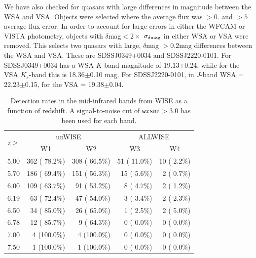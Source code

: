 \documentclass[usenatbib]{mnras}
\begin{document}
  We have also checked for quasars with large differences in magnitude
  between the WSA and VSA. Objects were selected where the average flux
  was $>0.$ and $>5$ average flux error. In order to account for large
  errors in either the WFCAM or VISTA photometry, objects with $\delta$mag$
  < 2 \times$ $\sigma_{\delta\rm mag}$ in either WSA or VSA were removed. This
  selects two quasars with large, $\delta$mag $>0.2$mag differences
  between the WSA and VSA. These are SDSSJ0349+0034 and
  SDSSJ2220-0101. For SDSSJ0349+0034 has a WSA $K$-band magnitude of
  19.13$\pm$0.24, while for the VSA $K_s$-band this is 18.36$\pm$0.10
  mag. For SDSSJ2220-0101, in $J$-band WSA = 22.23$\pm$0.15, for the VSA
  = 19.38$\pm$0.04.
          
  
\begin{table}
  \centering
  \begin{tabular}{l r r r r}
    \hline \hline
    \multirow{ 2}{*}{$z \geq$} & \multicolumn{2}{c}{unWISE} &  \multicolumn{2}{c}{ALLWISE}   \\ 
                                             & \multicolumn{1}{c}{W1} & \multicolumn{1}{c}{W2} & \multicolumn{1}{c}{W3} & \multicolumn{1}{c}{W4}  \\ 
    \hline
    5.00   &   362 ( 78.2\%)   &   308 ( 66.5\%)  &    51 ( 11.0\%)  &    10 (  2.2\%) \\ 
    5.70   &   186 ( 69.4\%)   &   151 ( 56.3\%)  &    15 (  5.6\%)  &     2 (  0.7\%) \\ 
    6.00   &   109 ( 63.7\%)   &    91 ( 53.2\%)  &     8 (  4.7\%)  &     2 (  1.2\%) \\ 
    6.19   &    63 ( 72.4\%)   &    47 ( 54.0\%)  &     3 (  3.4\%)  &     2 (  2.3\%) \\ 
    6.50   &    34 ( 85.0\%)   &    26 ( 65.0\%)  &     1 (  2.5\%)  &     2 (  5.0\%) \\ 
    6.78   &    12 ( 85.7\%)   &     9 ( 64.3\%)  &     0 (  0.0\%)  &     0 (  0.0\%) \\ 
    7.00   &     4 (100.0\%)   &     4 (100.0\%)  &     0 (  0.0\%)  &     0 (  0.0\%) \\ 
    7.50   &     1 (100.0\%)   &     1 (100.0\%)  &     0 (  0.0\%)  &     0 (  0.0\%) \\ 
    \hline \hline
  \end{tabular}
  \caption{Detection rates in the mid-infrared bands from WISE as a function of 
    redshift. A signal-to-noise cut of {\tt w$x$snr}$>3.0$ has been used for each band.}
  \label{tab:mir_detection}
\end{table}
\end{document}
